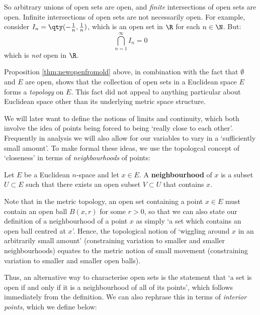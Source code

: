 So arbitrary unions of open sets are open, and \emph{finite} intersections of open sets are open. Infinite intersections of open sets are not necessarily open. For example, consider \( I_n=\qty(-\frac{1}{n},\frac{1}{n}) \), which is an open set in \( \R \) for each \( n\in\N \). But:
\[ \bigcap_{n=1}^\infty I_n=\qty{0} \]
which is \emph{not} open in \( \R \).

\vspace{3mm}

Proposition \ref{thm:newopenfromold} above, in combination with the fact that \( \emptyset \) and \( E \) are open, shows that the collection of open sets in a Euclidean space \( E \) forms a \emph{topology} on \( E \). This fact did not appeal to anything particular about Euclidean space other than its underlying metric space structure.

\vspace{3mm}

We will later want to define the notions of limits and continuity, which both involve the idea of points being forced to being `really close to each other'. Frequently in analysis we will also allow for our variables to vary in a `sufficiently small amount'. To make formal these ideas, we use the topologcal concept of `closeness' in terms of \emph{neighbourhoods} of points:

\begin{definition}
  Let \( E \) be a Euclidean \( n \)-space and let \( x\in E \). A \textbf{neighbourhood} of \( x \) is a subset \( U\subset E \) such that there exists an open subset \( V\subset U \) that contains \( x \).
\end{definition}

Note that in the metric topology, an open set containing a point \( x\in E \) must contain an open ball \( B(x,r) \) for some \( r>0 \), so that we can also state our definition of a neighbourhood of a point \( x \) as simply `a set which contains an open ball centred at \( x \)'. Hence, the topological notion of `wiggling around \( x \) in an arbitrarily small amount' (constraining variation to smaller and smaller neighbourhoods) equates to the metric notion of small movement (constraining variation to smaller and smaller open balls).

\vspace{3mm}

Thus, an alternative way to characterise open sets is the statement that `a set is open if and only if it is a neighbourhood of all of its points', which follows immediately from the definition. We can also rephrase this in terms of \emph{interior points}, which we define below:

